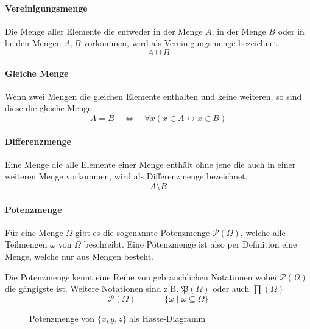 \paragraph{Vereinigungsmenge} Die Menge aller Elemente die entweder in
der Menge $A$, in der Menge $B$ oder in beiden Mengen $A,B$ vorkommen,
wird als \gls{Vereinigungsmenge} bezeichnet.
\[  
	A \cup B
\]

\paragraph{Gleiche Menge} Wenn zwei Mengen die gleichen Elemente
enthalten und keine weiteren, so sind diese die \gls{gleiche Menge}.
\[  
	A = B 
	\quad \Leftrightarrow \quad 
	\forall x (x \in A \leftrightarrow x \in B)
\]

\paragraph{Differenzmenge}
Eine Menge die alle Elemente einer Menge enthält ohne jene die auch
in einer weiteren Menge vorkommen, wird als \gls{Differenzmenge} 
bezeichnet.
\[
	A \setminus B 
\]

\paragraph{Potenzmenge}
Für eine Menge $\Omega$ gibt es die sogenannte \gls{Potenzmenge} 
$\mathcal{P}(\Omega)$, welche alle Teilmengen $\omega$ von $\Omega$ 
beschreibt.
Eine Potenzmenge ist also per Definition eine Menge, welche nur
aus Mengen besteht. 

Die Potenzmenge kennt eine Reihe von gebräuchlichen
Notationen wobei $\mathcal{P}(\Omega)$ die gängigste ist. Weitere 
Notationen sind z.B. $\mathfrak{P}(\Omega)$ oder auch
$\prod(\Omega)$
\[ 
	\mathcal{P}(\Omega) 
		\quad = \quad \{\omega \mid \omega \subseteq \Omega \}
\]

\begin{figure}[h!]
	\centering
	\caption{Potenzmenge von $\{x,y,z\}$ als Hasse-Diagramm}
\end{figure}

